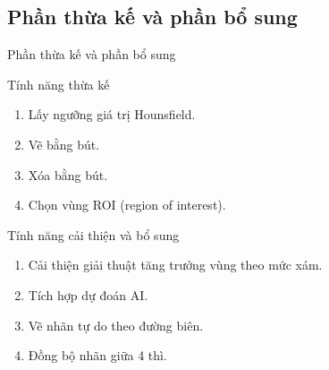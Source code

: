 \documentclass[
	10pt,                %
	aspectratio=169,     %
]{beamer}
\begin{document}
\subsection{Phần thừa kế và phần bổ sung}
	\begin{frame}{Phần thừa kế và phần bổ sung}{}
		\begin{block}{Tính năng thừa kế}
			\begin{enumerate}
				\item Lấy ngưỡng giá trị Hounsfield. %
				\item Vẽ bằng bút.
				\item Xóa bằng bút.
				\item Chọn vùng ROI (region of interest).
			\end{enumerate}
		\end{block}
		
		\begin{block}{Tính năng cải thiện và bổ sung}
			\begin{enumerate}
				\item Cải thiện giải thuật tăng trưởng vùng theo mức xám.
				\item Tích hợp dự đoán AI.
				\item Vẽ nhãn tự do theo đường biên. 
				\item Đồng bộ nhãn giữa 4 thì.
			\end{enumerate}
		\end{block}
	\end{frame}	
	
\end{document}
